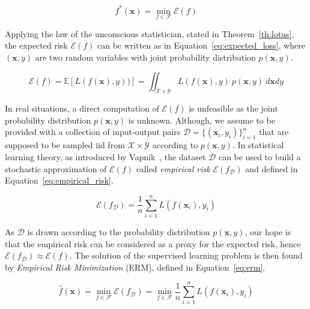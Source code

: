 \begin{equation} \label{eq:fstar}
	f^*(\bm{x}) = \min_{f \in \mathcal{F}}{\mathcal{E}(f)}
\end{equation}

Applying the law of the unconscious statistician, stated in Theorem~\ref{th:lotus}, the expected risk $\mathcal{E}(f)$ can be written as in Equation~\eqref{eq:expected_loss}, where $(\bm{x},y)$ are two random variables with joint probability distribution $p(\bm{x},y)$.

\begin{equation} \label{eq:expected_loss}
	\mathcal{E}(f) = \mathbb{E}[L(f(\bm{x}),y))] = \iint_{\mathcal{X} \times \mathcal{Y}}L(f(\bm{x}),y)~p(\bm{x},y)~d\bm{x}dy
\end{equation}

In real situations, a direct computation of $\mathcal{E}(f)$ is unfeasible as the joint probability distribution $p(\bm{x},y)$ is unknown. Although, we assume to be provided with a collection of input-output pairs $\mathcal{D}=\{(\bm{x}_i,y_i)\}_{i=1}^n$ that are supposed to be sampled \ac{iid} from $\mathcal{X} \times \mathcal{Y}$ according to $p(\bm{x}, y)$.
In statistical learning theory, as introduced by Vapnik~\cite{vapnik2013nature}, the dataset $\mathcal{D}$ can be used to build a stochastic approximation of $\mathcal{E}(f)$ called \textit{empirical risk} $\mathcal{E}(f_{\mathcal{D}})$ and defined in Equation~\eqref{eq:empirical_risk}.

\begin{equation} \label{eq:empirical_risk}
	\mathcal{E}(f_{\mathcal{D}}) = \frac{1}{n} \sum_{i=1}^{n} L(f(\bm{x}_i), y_i)
\end{equation}

As $\mathcal{D}$ is drawn according to the probability distribution $p(\bm{x},y)$, our hope is that the empirical risk can be considered as a proxy for the expected risk, hence $\mathcal{E}(f_{\mathcal{D}}) \approx \mathcal{E}(f)$. The solution of the supervised learning problem is then found by \textit{Empirical Risk Minimization} (ERM), defined in Equation~\eqref{eq:erm}.

\begin{equation} \label{eq:erm}
	\hat f(\bm{x}) = \min_{f \in \mathcal{F}}{\mathcal{E}(f_{\mathcal{D}})} = \min_{f \in \mathcal{F}}{\frac{1}{n} \sum_{i=1}^{n} L(f(\bm{x}_i), y_i)}
\end{equation}

